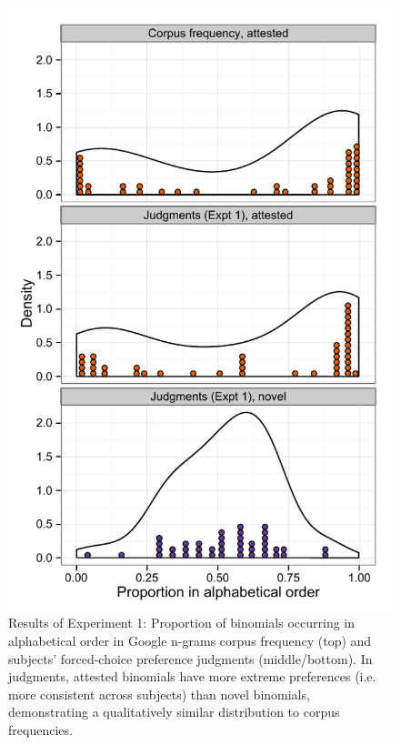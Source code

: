 \documentclass[authoryear]{elsarticle}
\begin{document}
\begin{figure}[t]
\centering
\includegraphics[scale=0.8]{just-judge-density-vertical.pdf}
\caption{Results of Experiment 1: Proportion of binomials occurring in alphabetical order in Google n-grams corpus frequency (top) and subjects' forced-choice preference judgments (middle/bottom). In judgments, attested binomials have more extreme preferences (i.e. more consistent across subjects) than novel binomials, demonstrating a qualitatively similar distribution to corpus frequencies.} \label{fig:judge}
\end{figure}
\end{document}
